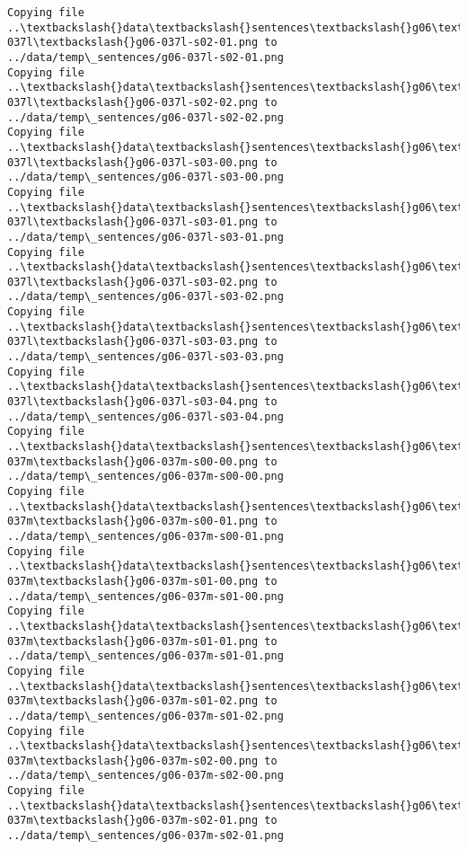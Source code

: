 \documentclass[11pt]{article}
\begin{document}
\begin{Verbatim}[commandchars=\\\{\}]
Copying file ..\textbackslash{}data\textbackslash{}sentences\textbackslash{}g06\textbackslash{}g06-037l\textbackslash{}g06-037l-s02-01.png to
../data/temp\_sentences/g06-037l-s02-01.png
Copying file ..\textbackslash{}data\textbackslash{}sentences\textbackslash{}g06\textbackslash{}g06-037l\textbackslash{}g06-037l-s02-02.png to
../data/temp\_sentences/g06-037l-s02-02.png
Copying file ..\textbackslash{}data\textbackslash{}sentences\textbackslash{}g06\textbackslash{}g06-037l\textbackslash{}g06-037l-s03-00.png to
../data/temp\_sentences/g06-037l-s03-00.png
Copying file ..\textbackslash{}data\textbackslash{}sentences\textbackslash{}g06\textbackslash{}g06-037l\textbackslash{}g06-037l-s03-01.png to
../data/temp\_sentences/g06-037l-s03-01.png
Copying file ..\textbackslash{}data\textbackslash{}sentences\textbackslash{}g06\textbackslash{}g06-037l\textbackslash{}g06-037l-s03-02.png to
../data/temp\_sentences/g06-037l-s03-02.png
Copying file ..\textbackslash{}data\textbackslash{}sentences\textbackslash{}g06\textbackslash{}g06-037l\textbackslash{}g06-037l-s03-03.png to
../data/temp\_sentences/g06-037l-s03-03.png
Copying file ..\textbackslash{}data\textbackslash{}sentences\textbackslash{}g06\textbackslash{}g06-037l\textbackslash{}g06-037l-s03-04.png to
../data/temp\_sentences/g06-037l-s03-04.png
Copying file ..\textbackslash{}data\textbackslash{}sentences\textbackslash{}g06\textbackslash{}g06-037m\textbackslash{}g06-037m-s00-00.png to
../data/temp\_sentences/g06-037m-s00-00.png
Copying file ..\textbackslash{}data\textbackslash{}sentences\textbackslash{}g06\textbackslash{}g06-037m\textbackslash{}g06-037m-s00-01.png to
../data/temp\_sentences/g06-037m-s00-01.png
Copying file ..\textbackslash{}data\textbackslash{}sentences\textbackslash{}g06\textbackslash{}g06-037m\textbackslash{}g06-037m-s01-00.png to
../data/temp\_sentences/g06-037m-s01-00.png
Copying file ..\textbackslash{}data\textbackslash{}sentences\textbackslash{}g06\textbackslash{}g06-037m\textbackslash{}g06-037m-s01-01.png to
../data/temp\_sentences/g06-037m-s01-01.png
Copying file ..\textbackslash{}data\textbackslash{}sentences\textbackslash{}g06\textbackslash{}g06-037m\textbackslash{}g06-037m-s01-02.png to
../data/temp\_sentences/g06-037m-s01-02.png
Copying file ..\textbackslash{}data\textbackslash{}sentences\textbackslash{}g06\textbackslash{}g06-037m\textbackslash{}g06-037m-s02-00.png to
../data/temp\_sentences/g06-037m-s02-00.png
Copying file ..\textbackslash{}data\textbackslash{}sentences\textbackslash{}g06\textbackslash{}g06-037m\textbackslash{}g06-037m-s02-01.png to
../data/temp\_sentences/g06-037m-s02-01.png

\end{Verbatim}
\end{document}
